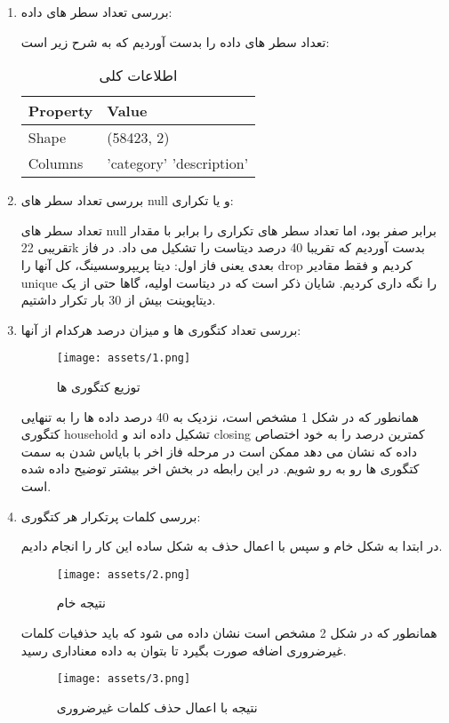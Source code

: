 \documentclass[a4paper,12pt]{article}
\begin{document}
\begin{enumerate}
	\item 
	بررسی تعداد سطر های داده:
	
	تعداد سطر های داده را بدست آوردیم که به شرح زیر است:
	\begin{table}[h]
		\centering
		\begin{tabular}{|l|l|}
			\hline
			\textbf{Property} & \textbf{Value} \\
			\hline
			Shape & (58423, 2) \\
			\hline
			Columns & 'category' 'description' \\
			\hline
		\end{tabular}
		\caption{اطلاعات کلی}
	\end{table}
	
	\item 
	بررسی تعداد سطر های null و یا تکراری:
	
	تعداد سطر های null برابر صفر بود، اما تعداد سطر های تکراری را برابر با مقدار تقریبی 22k بدست آوردیم که تقریبا 40 درصد دیتاست را تشکیل می داد. در فاز بعدی یعنی فاز اول: دیتا پریپروسسینگ، کل آنها را drop کردیم و فقط مقادیر unique را نگه داری کردیم. شایان ذکر است که در دیتاست اولیه، گاها حتی از یک دیتاپوینت بیش از 30 بار تکرار داشتیم.
	
	\item 
	بررسی تعداد کتگوری ها و میزان درصد هرکدام از آنها:
	\begin{figure}[h]
		\centering
		\texttt{[image: assets/1.png]}
		\caption{\textcolor{CustomAccent}{توزیع کتگوری ها}}
	\end{figure}
	همانطور که در شکل 1 مشخص است، نزدیک به 40 درصد داده ها را به تنهایی کتگوری household تشکیل داده اند و closing کمترین درصد را به خود اختصاص داده که نشان می دهد ممکن است در مرحله فاز اخر با بایاس شدن به سمت کتگوری ها رو به رو شویم. در این رابطه در بخش اخر بیشتر توضیح داده شده است.
	
	\item 
	بررسی کلمات پرتکرار هر کتگوری:
	
	در ابتدا به شکل خام و سپس با اعمال حذف به شکل ساده این کار را انجام دادیم.
\begin{figure}[H]
	\centering
	\texttt{[image: assets/2.png]}
	\caption{\textcolor{CustomAccent}{نتیجه خام}}
\end{figure}
همانطور که در شکل 2 مشخص است نشان داده می شود که باید حذفیات کلمات غیرضروری اضافه صورت بگیرد تا بتوان  به داده معناداری رسید.

\begin{figure}[H]
	\centering
	\texttt{[image: assets/3.png]}
	\caption{\textcolor{CustomAccent}{نتیجه با اعمال حذف کلمات غیرضروری}}
\end{figure}


\end{enumerate}
\end{document}
